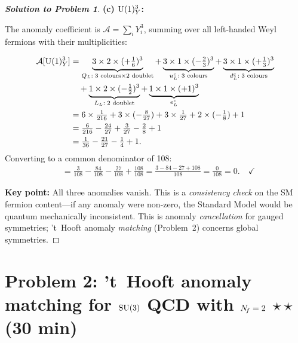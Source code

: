 \documentclass[11pt,a4paper]{article}
\begin{document}
\begin{proof}[\textbf{Solution to Problem 1}]
\textbf{(c) $\mathrm{U}(1)_Y^3$:}

The anomaly coefficient is $\mathcal{A} = \sum_i Y_i^3$, summing over all
left-handed Weyl fermions with their multiplicities:

\begin{align}
  \mathcal{A}[\mathrm{U}(1)_Y^3]
  &= \underbrace{3 \times 2 \times (+\tfrac{1}{6})^3}_{Q_L:\;3\text{ colours}\times 2\text{ doublet}}
   + \underbrace{3 \times 1 \times (-\tfrac{2}{3})^3}_{u_L^c:\;3\text{ colours}}
   + \underbrace{3 \times 1 \times (+\tfrac{1}{3})^3}_{d_L^c:\;3\text{ colours}} \nonumber \\
  &\quad + \underbrace{1 \times 2 \times (-\tfrac{1}{2})^3}_{L_L:\;2\text{ doublet}}
   + \underbrace{1 \times 1 \times (+1)^3}_{e_L^c} \nonumber \\
  &= 6 \times \tfrac{1}{216}
   + 3 \times (-\tfrac{8}{27})
   + 3 \times \tfrac{1}{27}
   + 2 \times (-\tfrac{1}{8})
   + 1 \nonumber \\
  &= \tfrac{6}{216} - \tfrac{24}{27} + \tfrac{3}{27} - \tfrac{2}{8} + 1 \nonumber \\
  &= \tfrac{1}{36} - \tfrac{21}{27} - \tfrac{1}{4} + 1.
\end{align}
Converting to a common denominator of 108:
\begin{align}
  &= \tfrac{3}{108} - \tfrac{84}{108} - \tfrac{27}{108} + \tfrac{108}{108}
   = \tfrac{3 - 84 - 27 + 108}{108}
   = \tfrac{0}{108} = 0. \quad\checkmark
\end{align}

\textbf{Key point:} All three anomalies vanish. This is a \emph{consistency
check} on the SM fermion content---if any anomaly were non-zero, the Standard
Model would be quantum mechanically inconsistent. This is anomaly
\emph{cancellation} for gauged symmetries; 't~Hooft anomaly
\emph{matching} (Problem~2) concerns global symmetries.
\end{proof}

\newpage

\section*{Problem 2: 't~Hooft anomaly matching for $\mathrm{SU}(3)$ QCD with $N_{\!f} = 2$
  \hfill $\star\star$ \normalsize(30 min)}
\label{prob:su3-nf2}
\end{document}
